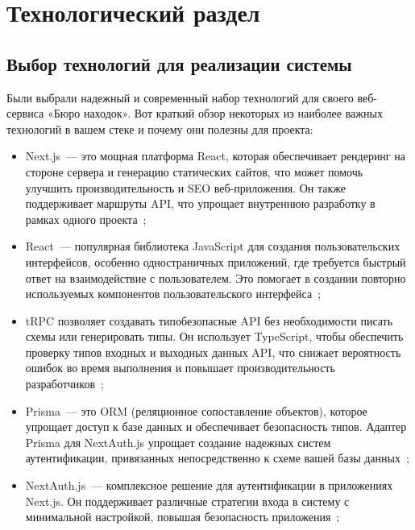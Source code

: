 \section{Технологический раздел}
\label{sec:technology}

\subsection{Выбор технологий для реализации системы}

Были выбрали надежный и современный набор технологий для своего веб-сервиса «Бюро находок». Вот краткий обзор некоторых из наиболее важных технологий в вашем стеке и почему они полезны для проекта:

\begin{itemize}[wide=0pt]
	\item Next.js~--- это мощная платформа React, которая обеспечивает рендеринг на стороне сервера и генерацию статических сайтов, что может помочь улучшить производительность и SEO веб-приложения. Он также поддерживает маршруты API, что упрощает внутреннюю разработку в рамках одного проекта~\cite{bib:nextjs};
	
	\item React~--- популярная библиотека JavaScript для создания пользовательских интерфейсов, особенно одностраничных приложений, где требуется быстрый ответ на взаимодействие с пользователем. Это помогает в создании повторно используемых компонентов пользовательского интерфейса~\cite{bib:reactjs};
	
	\item tRPC позволяет создавать типобезопасные API без необходимости писать схемы или генерировать типы. Он использует TypeScript, чтобы обеспечить проверку типов входных и выходных данных API, что снижает вероятность ошибок во время выполнения и повышает производительность разработчиков~\cite{bib:trpc};
	
	\item Prisma~--- это ORM (реляционное сопоставление объектов), которое упрощает доступ к базе данных и обеспечивает безопасность типов. Адаптер Prisma для NextAuth.js упрощает создание надежных систем аутентификации, привязанных непосредственно к схеме вашей базы данных~\cite{bib:prisma};
	
	\item NextAuth.js~--- комплексное решение для аутентификации в приложениях Next.js. Он поддерживает различные стратегии входа в систему с минимальной настройкой, повышая безопасность приложения~\cite{bib:nextauth};
	

\end{itemize}
